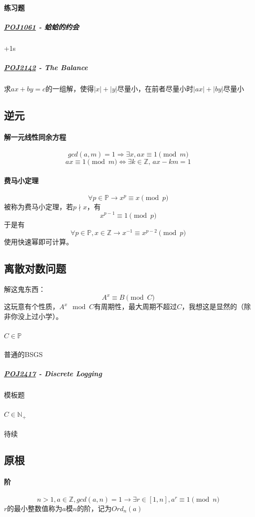 \documentclass[]{cpp}
\begin{document}
\paragraph{练习题}
\subparagraph{\href{http://poj.org/problem?id=1061}{POJ1061} - 蛤蛤的约会} +1s
\subparagraph{\href{http://poj.org/problem?id=2142}{POJ2142} - The Balance} 求$ax+by=c$的一组解，使得$|x|+|y|$尽量小，在前者尽量小时$|ax|+|by|$尽量小
\subsection{逆元}
\paragraph{解一元线性同余方程}
	$$gcd(a,m)=1\Rightarrow\exists x,ax\equiv1\pmod{m}$$
	$$ax\equiv1\pmod{m}\iff\exists k\in\mathbb{Z},\,ax-km=1$$
\paragraph{费马小定理}
	$$\forall p\in\mathbb{P}\to x^p\equiv x\pmod{p}$$被称为费马小定理，若$p\nmid x$，有
	$$x^{p-1}\equiv 1\pmod{p}$$于是有
	$$\forall p\in\mathbb{P},x\in\mathbb{Z}\to x^{-1}\equiv x^{p-2}\pmod{p}$$
	使用快速幂即可计算。
\subsection{离散对数问题}
	解这鬼东西：$$A^x\equiv B\pmod{C}$$ 这玩意有个性质，$A^x\mod C$有周期性，最大周期不超过$C$，我想这是显然的（除非你没上过小学）。
\paragraph{$C\in\mathbb{P}$}
	普通的BSGS
\subparagraph{\href{http://poj.org/problem?id=2417}{POJ2417} - Discrete Logging} 模板题
\paragraph{$C\in\mathbb{N_+}$}
	待续
\subsection{原根}
\paragraph{阶}
	$$n>1,a\in\mathbb{Z},gcd(a,n)=1\to\exists r\in[1,n],a^r\equiv1\pmod{n}$$ $r$的最小整数值称为$a$模$n$的阶，记为$Ord_n(a)$
\end{document}
